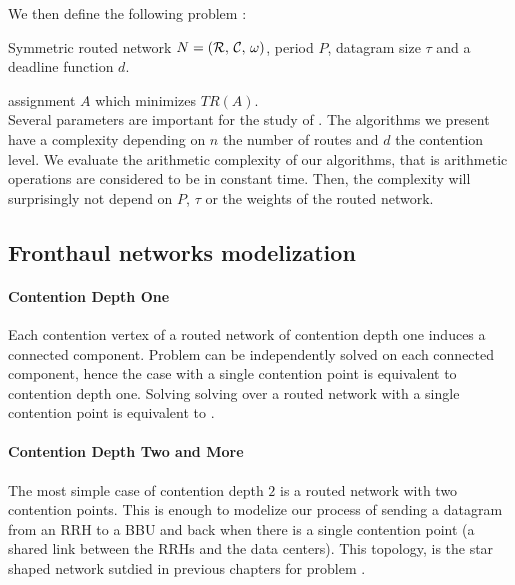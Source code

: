 We then define the following problem :


        Symmetric routed network $N = ({\cal R},\,{\cal C},\,\omega)$, period $P$, datagram size $\tau$ and a deadline function $d$.%
      

       assignment $A$ which minimizes $TR(A)$.
      \\
    
    Several parameters are important for the study of \spall. The algorithms we present have a complexity
    depending on $n$ the number of routes and $d$ the contention level. We evaluate the arithmetic complexity of our algorithms, that is arithmetic operations are considered to be in constant time. Then, the complexity will surprisingly not depend on $P$, $\tau$ or the weights of the routed network.

\subsection{Fronthaul networks modelization}\label{sec:fronthaul}

\paragraph*{Contention Depth One}
Each contention vertex of a routed network of contention depth one induces a connected component. 
Problem \spall can be independently solved on each connected component, hence the case with a single contention point is equivalent to contention depth one. 
Solving solving \spall over 
a routed network with a single contention point is equivalent to \wta. 

\paragraph*{Contention Depth Two and More}

The most simple case of contention depth $2$ is a routed network with two contention points. 
This is enough to modelize our process of sending a datagram from an RRH to a BBU and back when
there is a single contention point (a shared link between the RRHs and the data centers). 
This topology, is the star shaped network sutdied in previous chapters for problem \pall.


